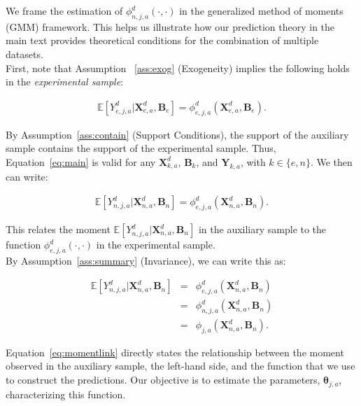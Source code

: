 \noindent We frame the estimation of $\phi^d_{n,j,a} (\cdot, \cdot)$ in the generalized method of moments (GMM) framework. This helps us illustrate how our prediction theory in the main text provides theoretical conditions for the combination of multiple datasets.\\

\noindent First, note that Assumption ~\ref{ass:exog} (Exogeneity) implies the following holds in the \textit{experimental sample}: 

\begin{eqnarray}
\mathbb{E} \left[ Y_{e,j,a}^d | \bm{X}_{e,a}^d, \bm{B}_{e} \right] =  \phi^d_{e,j,a}\left( \bm{X}_{e,a}^d, \bm{B}_{e} \right). \label{eq:main}
\end{eqnarray}

\noindent By Assumption~\ref{ass:contain} (Support Conditions), the support of the auxiliary sample contains the support of the experimental sample. Thus, Equation~\eqref{eq:main} is valid for any $\bm{X}^d_{k,a}$, $\bm{B}_{k}$, and $\bm{Y}_{k,a}$, with $k \in \{ e, n\}$. We then can write: 

\begin{eqnarray}
\mathbb{E} \left[ Y_{n,j,a}^d | \bm{X}_{n,a}^d, \bm{B}_{n} \right] =  \phi^d_{e,j,a}\left( \bm{X}_{n,a}^d, \bm{B}_{n} \right).
\end{eqnarray}

\noindent This relates the moment $\mathbb{E} \left[ Y_{n,j,a}^d | \bm{X}_{n,a}^d, \bm{B}_{n} \right]$ in the auxiliary sample to the function  $\phi^d_{e,j,a}\left( \cdot, \cdot \right)$ in the experimental sample.\\

\noindent By Assumption~\ref{ass:summary} (Invariance), we can write this as: 

\begin{eqnarray}\label{eq:momentlink}
\mathbb{E} \left[ Y_{n,j,a}^d | \bm{X}_{n,a}^d, \bm{B}_{n} \right] &=&  \phi^d_{e,j,a}\left( \bm{X}_{n,a}^d, \bm{B}_{n} \right) \nonumber \\ 
 &=&  \phi^d_{n,j,a}\left( \bm{X}_{n,a}^d, \bm{B}_{n} \right) \nonumber \\
 &=&  \phi_{j,a}\left( \bm{X}_{n,a}^d, \bm{B}_{n} \right). \label{eq:mainpred}
\end{eqnarray}

\noindent Equation~\eqref{eq:momentlink} directly states the relationship between the moment observed in the auxiliary sample, the left-hand side, and the function that we use to construct the predictions. Our objective is to estimate the parameters, $\bm{\theta}_{j,a}$, characterizing this function.\\ 

